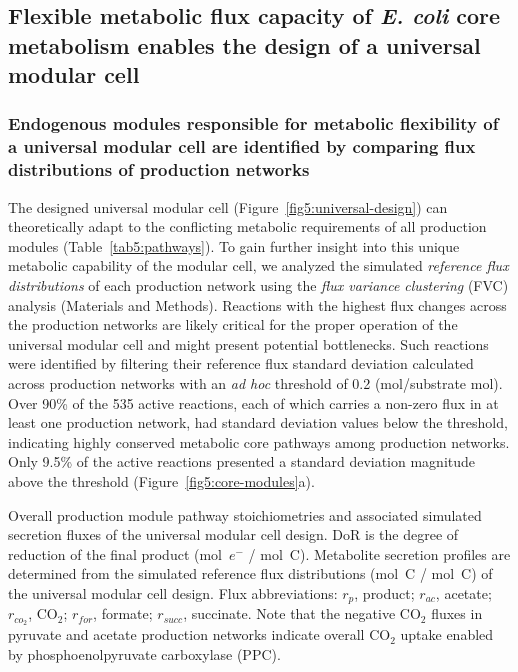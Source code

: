 \subsection{Flexible metabolic flux capacity of \textit{E. coli} core metabolism enables the design of a universal modular cell}

\subsubsection{Endogenous modules responsible for metabolic flexibility of a universal modular cell are identified by comparing flux distributions of production networks}
The designed universal modular cell (Figure~\ref{fig5:universal-design}) can theoretically adapt to the conflicting metabolic requirements of all production modules (Table~\ref{tab5:pathways}).
To gain further insight into this unique metabolic capability of the modular cell, we analyzed the simulated \emph{reference flux distributions} of each production network using the \emph{flux variance clustering} (FVC) analysis (Materials and Methods).
Reactions with the highest flux changes across the production networks are likely critical for the proper operation of the universal modular cell and might present potential bottlenecks.
Such reactions were identified by filtering their reference flux standard deviation calculated across production networks with an \textit{ad hoc} threshold of 0.2 (mol/substrate mol).
Over 90\% of the 535 active reactions, each of which carries a non-zero flux in at least one production network, had standard deviation values below the threshold, indicating  highly conserved metabolic core pathways among production networks. Only 9.5\% of the active reactions presented a standard deviation magnitude above the threshold (Figure~\ref{fig5:core-modules}a).


\begin{table}[!ht]
    \caption[Overall production module pathway stoichiometries and associated simulated secretion fluxes of the universal modular cell design]{Overall production module pathway stoichiometries and associated simulated secretion fluxes of the universal modular cell design.
    DoR is the degree of reduction of the final product (mol~$e^-$ / mol~C). Metabolite secretion profiles are determined from the simulated reference flux distributions (mol~C / mol~C) of the universal modular cell design.
    Flux abbreviations: $r_{p}$, product; $r_{ac}$, acetate; $r_{co_2}$, CO$_2$; $r_{for}$, formate; $r_{succ}$, succinate.
    Note that the negative CO$_2$ fluxes in pyruvate and acetate production networks indicate overall CO$_2$ uptake enabled by phosphoenolpyruvate carboxylase (PPC).}
    \centering
 	
    \label{tab5:pathways}
\end{table}



